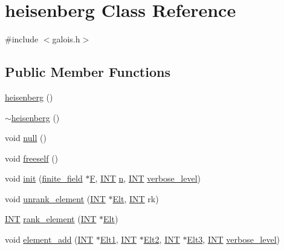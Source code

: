 \hypertarget{classheisenberg}{}\section{heisenberg Class Reference}
\label{classheisenberg}


{\ttfamily \#include $<$galois.\+h$>$}

\subsection*{Public Member Functions}
\begin{DoxyCompactItemize}
\item 
\mbox{\hyperlink{classheisenberg_a3b84a07f0f518ca32ffb17c8114a3bb7}{heisenberg}} ()
\item 
\mbox{\hyperlink{classheisenberg_a48ed5a56e78ec40c8d7305a245efbabb}{$\sim$heisenberg}} ()
\item 
void \mbox{\hyperlink{classheisenberg_ab448e495e2824699ceb3315371234646}{null}} ()
\item 
void \mbox{\hyperlink{classheisenberg_a3196baf0d43d79f3643cd6612ba51d2d}{freeself}} ()
\item 
void \mbox{\hyperlink{classheisenberg_ab45bf633370b097f5500a8499b165151}{init}} (\mbox{\hyperlink{classfinite__field}{finite\+\_\+field}} $\ast$\mbox{\hyperlink{classheisenberg_aeabec971ff171af2bbd41b2f64bd2e3a}{F}}, \mbox{\hyperlink{galois_8h_a09fddde158a3a20bd2dcadb609de11dc}{I\+NT}} \mbox{\hyperlink{classheisenberg_a5f434f747ceebaede3371d5e265c40e0}{n}}, \mbox{\hyperlink{galois_8h_a09fddde158a3a20bd2dcadb609de11dc}{I\+NT}} \mbox{\hyperlink{simeon_8_c_a818073fbcc2f439e7c56952f67386122}{verbose\+\_\+level}})
\item 
void \mbox{\hyperlink{classheisenberg_a45f9de07eb289caa5497e052fa74b994}{unrank\+\_\+element}} (\mbox{\hyperlink{galois_8h_a09fddde158a3a20bd2dcadb609de11dc}{I\+NT}} $\ast$\mbox{\hyperlink{simeon_8_c_aec1406935bdb1fee3561fcb840964100}{Elt}}, \mbox{\hyperlink{galois_8h_a09fddde158a3a20bd2dcadb609de11dc}{I\+NT}} rk)
\item 
\mbox{\hyperlink{galois_8h_a09fddde158a3a20bd2dcadb609de11dc}{I\+NT}} \mbox{\hyperlink{classheisenberg_a972b9c211fb4093a381a8b2a0dee30bd}{rank\+\_\+element}} (\mbox{\hyperlink{galois_8h_a09fddde158a3a20bd2dcadb609de11dc}{I\+NT}} $\ast$\mbox{\hyperlink{simeon_8_c_aec1406935bdb1fee3561fcb840964100}{Elt}})
\item 
void \mbox{\hyperlink{classheisenberg_afca08c599ec9225baedede3b0233bdec}{element\+\_\+add}} (\mbox{\hyperlink{galois_8h_a09fddde158a3a20bd2dcadb609de11dc}{I\+NT}} $\ast$\mbox{\hyperlink{classheisenberg_a6020d937f6761e6c392fe4f3c4b65755}{Elt1}}, \mbox{\hyperlink{galois_8h_a09fddde158a3a20bd2dcadb609de11dc}{I\+NT}} $\ast$\mbox{\hyperlink{classheisenberg_a681a960e90968d4af527c4247dc4cb61}{Elt2}}, \mbox{\hyperlink{galois_8h_a09fddde158a3a20bd2dcadb609de11dc}{I\+NT}} $\ast$\mbox{\hyperlink{classheisenberg_a04d358f005654f254fbe2613e298c77a}{Elt3}}, \mbox{\hyperlink{galois_8h_a09fddde158a3a20bd2dcadb609de11dc}{I\+NT}} \mbox{\hyperlink{simeon_8_c_a818073fbcc2f439e7c56952f67386122}{verbose\+\_\+level}})

\end{DoxyCompactItemize}
